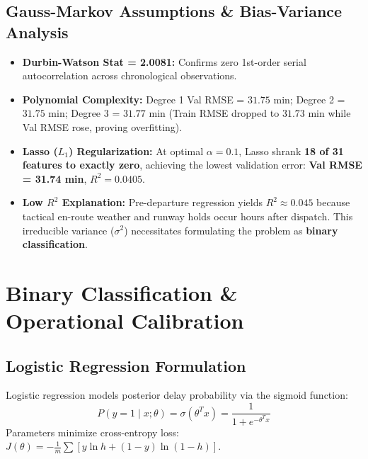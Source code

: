 \documentclass[11pt,a4paper]{article}
\begin{document}
\subsection{Gauss-Markov Assumptions \& Bias-Variance Analysis}
\begin{itemize}[noitemsep]
    \item \textbf{Durbin-Watson Stat = 2.0081:} Confirms zero 1st-order serial autocorrelation across chronological observations.
    \item \textbf{Polynomial Complexity:} Degree 1 Val RMSE = $31.75$ min; Degree 2 = $31.75$ min; Degree 3 = $31.77$ min (Train RMSE dropped to $31.73$ min while Val RMSE rose, proving overfitting).
    \item \textbf{Lasso ($L_1$) Regularization:} At optimal $\alpha = 0.1$, Lasso shrank \textbf{18 of 31 features to exactly zero}, achieving the lowest validation error: \textbf{Val RMSE = 31.74 min}, \textbf{$R^2 = 0.0405$}.
    \item \textbf{Low $R^2$ Explanation:} Pre-departure regression yields $R^2 \approx 0.045$ because tactical en-route weather and runway holds occur hours after dispatch. This irreducible variance ($\sigma^2$) necessitates formulating the problem as \textbf{binary classification}.
\end{itemize}

\section{Binary Classification \& Operational Calibration}

\subsection{Logistic Regression Formulation}
Logistic regression models posterior delay probability via the sigmoid function:
\begin{equation}
    P(y = 1 \mid x; \theta) = \sigma(\theta^T x) = \frac{1}{1 + e^{-\theta^T x}}
\end{equation}
Parameters minimize cross-entropy loss: $J(\theta) = -\frac{1}{m} \sum [y \ln h + (1 - y) \ln (1 - h)]$.
\end{document}
